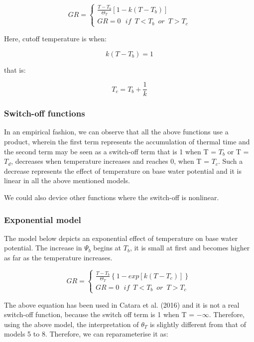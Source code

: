 \documentclass[a4paper,12pt]{article}
\begin{document}
\begin{equation}
GR = \left\{ {\begin{array}{*{20}{l}}
\frac{T - T_b}{\Theta_T} \left[ 1 - k (T - T_b) \right] \\
GR = 0 \,\,\,\, if \,\,\, T < T_b \,\,\, or \,\,\, T > T_c
\end{array}} \right.
\end{equation}

Here, cutoff temperature is when:

\[ k(T - T_b) = 1\]

that is:

\[ T_c = T_b + \frac{1}{k}\]

\subsubsection{Switch-off functions}\label{switch-off-functions}

In an empirical fashion, we can observe that all the above functions use
a product, wherein the first term represents the accumulation of thermal
time and the second term may be seen as a switch-off term that is 1 when
T = \(T_b\) or T = \(T_d\), decreases when temperature increases and
reaches 0, when T = \(T_c\). Such a decrease represents the effect of
temperature on base water potential and it is linear in all the above
mentioned models.

We could also device other functions where the switch-off is nonlinear.

\subsubsection{Exponential model}\label{exponential-model}

The model below depicts an exponential effect of temperature on base
water potential. The increase in \(\Psi_b\) begins at \(T_b\), it is
small at first and becomes higher as far as the temperature increases.

\begin{equation}
GR = \left\{ {\begin{array}{*{20}{l}}
\frac{T - T_b}{\Theta_T} \left\{ 1 - exp \left[ k (T - T_c) \right] \right\} \\
GR = 0 \,\,\,\, if \,\,\, T < T_b \,\,\, or \,\,\, T > T_c
\end{array}} \right.
\end{equation}

The above equation has been used in Catara et al. (2016) and it is not a
real switch-off function, because the switch off term is 1 when T =
\(-\infty\). Therefore, using the above model, the interpretation of
\(\theta_T\) is slightly different from that of models 5 to 8.
Therefore, we can reparameterise it as:
\end{document}
